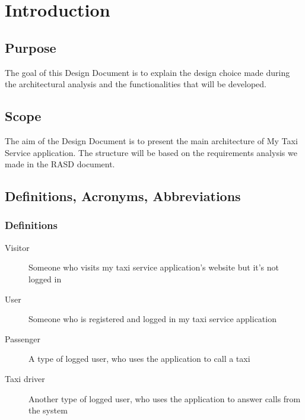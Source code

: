 \section{Introduction}

\subsection{Purpose}
The goal of this Design Document is to explain the design choice made during the architectural analysis and the functionalities that will be developed.

\subsection{Scope}
The aim of the Design Document is to present the main architecture of My Taxi Service application. The structure will be based on the requirements analysis we made in the RASD document. 

\subsection{Definitions, Acronyms, Abbreviations}
\subsubsection{Definitions}
\begin{description}
	\item [Visitor] Someone who visits my taxi service application's website but it's not logged in
	\item [User] Someone who is registered and logged in my taxi service application
	\item [Passenger] A type of logged user, who uses the application to call a taxi
	\item [Taxi driver] Another type of logged user, who uses the application to answer calls from the system
\end{description}

